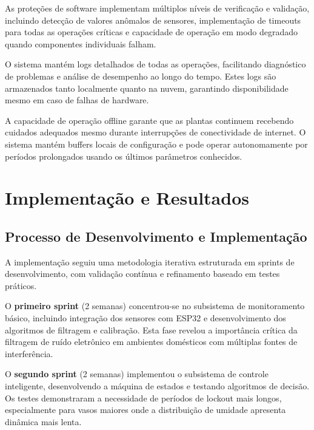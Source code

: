 \documentclass[oneside,english,brazilian]{UNISINOSmonografia}
\begin{document}
As proteções de software implementam múltiplos níveis de verificação e validação, incluindo detecção de valores anômalos de sensores, implementação de timeouts para todas as operações críticas e capacidade de operação em modo degradado quando componentes individuais falham.

O sistema mantém logs detalhados de todas as operações, facilitando diagnóstico de problemas e análise de desempenho ao longo do tempo. Estes logs são armazenados tanto localmente quanto na nuvem, garantindo disponibilidade mesmo em caso de falhas de hardware.

A capacidade de operação offline garante que as plantas continuem recebendo cuidados adequados mesmo durante interrupções de conectividade de internet. O sistema mantém buffers locais de configuração e pode operar autonomamente por períodos prolongados usando os últimos parâmetros conhecidos.



\chapter{Implementação e Resultados}

\section{Processo de Desenvolvimento e Implementação}

A implementação seguiu uma metodologia iterativa estruturada em sprints de desenvolvimento, com validação contínua e refinamento baseado em testes práticos.

O \textbf{primeiro sprint} (2 semanas) concentrou-se no subsistema de monitoramento básico, incluindo integração dos sensores com ESP32 e desenvolvimento dos algoritmos de filtragem e calibração. Esta fase revelou a importância crítica da filtragem de ruído eletrônico em ambientes domésticos com múltiplas fontes de interferência.

O \textbf{segundo sprint} (2 semanas) implementou o subsistema de controle inteligente, desenvolvendo a máquina de estados e testando algoritmos de decisão. Os testes demonstraram a necessidade de períodos de lockout mais longos, especialmente para vasos maiores onde a distribuição de umidade apresenta dinâmica mais lenta.
\end{document}
